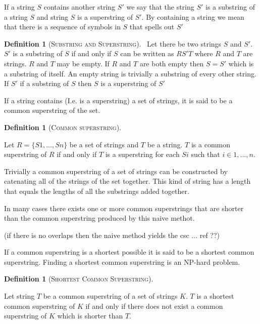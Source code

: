 \documentclass[english,twoside,censored,csm,algorithms-track-2020]{HYthesisML}
\theoremstyle{plain}
\theoremstyle{definition}
\newtheorem{definition}[equation]{Definition}
\begin{document}
If a string $S$ contains another string $S'$ we say that the string $S'$ is a substring of a string $S$ and string $S$ is a superstring of $S'$.
By containing a string we mean that there is a sequence of symbols in $S$ that spells out $S'$

\begin{definition}[\textsc{Substring and Superstring}]~\label{def-sub-super}
  Let there be two strings $S$ and $S'$.
  $S'$ is a substring of $S$ if and only if $S$ can be written as $RS'T$ where $R$ and $T$ are strings. $R$ and $T$ may be empty.
  If $R$ and $T$ are both empty then $S = S'$ which is a substring of itself.
  An empty string is trivially a substring of every other string.\\

  If $S'$ if a substring of $S$ then $S$ is a superstring of $S'$
\end{definition}

If a string contains (I.e. is a superstring) a set of strings, it is said to be a common superstring of the set.

\begin{definition}[\textsc{Common superstring}]~\label{def-cs}

  Let $R = \{S1,...,Sn\}$ be a set of strings and $T$ be a string.
  $T$ is a common superstring of $R$ if and only if $T$ is a superstring for each $Si$ such that $i\in 1,...,n$.
  
\end{definition}

Trivially a common superstring of a set of strings can be constructed by catenating all of the strings of the set together.
This kind of string has a length that equals the lengths of all the substrings added together.

In many cases there exists one or more common superstrings that are shorter than the common superstring produced by this naive methot.

(if there is no overlaps then the naive method yields the csc ... ref ??)

If a common superstring is a shortest possible it is said to be a shortest common superstring. Finding a shortest common superstring is
an \textsc{NP}-hard problem. 

\begin{definition}[\textsc{Shortest Common Superstring}]~\label{def-scs}

  Let string $T$ be a common superstring of a set of strings $K$.
  $T$ is a shortest common superstring of $K$ if and only if there does not exist a common superstring of $K$ which is shorter than $T$.
  
\end{definition}
\end{document}
